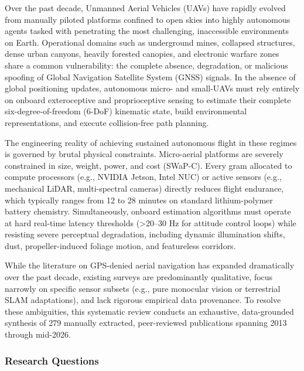 \documentclass[journal]{IEEEtran}
\begin{document}
Over the past decade, Unmanned Aerial Vehicles (UAVs) have rapidly
evolved from manually piloted platforms confined to open skies into
highly autonomous agents tasked with penetrating the most challenging,
inaccessible environments on Earth. Operational domains such as
underground mines, collapsed structures, dense urban canyons, heavily
forested canopies, and electronic warfare zones share a common
vulnerability: the complete absence, degradation, or malicious spoofing
of Global Navigation Satellite System (GNSS) signals. In the absence of
global positioning updates, autonomous micro- and small-UAVs must rely
entirely on onboard exteroceptive and proprioceptive sensing to estimate
their complete six-degree-of-freedom (6-DoF) kinematic state, build
environmental representations, and execute collision-free path planning.

The engineering reality of achieving sustained autonomous flight in
these regimes is governed by brutal physical constraints. Micro-aerial
platforms are severely constrained in size, weight, power, and cost
(SWaP-C). Every gram allocated to compute processors (e.g., NVIDIA
Jetson, Intel NUC) or active sensors (e.g., mechanical LiDAR,
multi-spectral cameras) directly reduces flight endurance, which
typically ranges from 12 to 28 minutes on standard lithium-polymer
battery chemistry. Simultaneously, onboard estimation algorithms must
operate at hard real-time latency thresholds (\textgreater20--30 Hz for
attitude control loops) while resisting severe perceptual degradation,
including dynamic illumination shifts, dust, propeller-induced foliage
motion, and featureless corridors.

While the literature on GPS-denied aerial navigation has expanded
dramatically over the past decade, existing surveys are predominantly
qualitative, focus narrowly on specific sensor subsets (e.g., pure
monocular vision or terrestrial SLAM adaptations), and lack rigorous
empirical data provenance. To resolve these ambiguities, this systematic
review conducts an exhaustive, data-grounded synthesis of 279 manually
extracted, peer-reviewed publications spanning 2013 through mid-2026.

\subsubsection{Research Questions}\label{research-questions}
\end{document}
